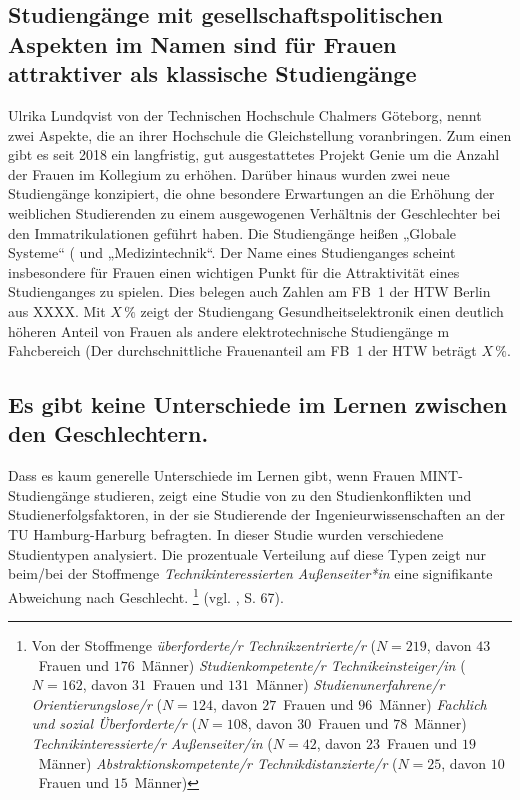 \documentclass[a4paper, 12 pt]{IEEEtran}
\begin{document}
\subsection{Studiengänge mit gesellschaftspolitischen Aspekten im Namen sind für Frauen attraktiver als klassische Studiengänge}
Ulrika Lundqvist von der Technischen Hochschule Chalmers Göteborg, nennt zwei Aspekte, die an ihrer Hochschule die Gleichstellung voranbringen. Zum einen gibt es seit 2018 ein langfristig, gut ausgestattetes Projekt Genie um die Anzahl der Frauen im Kollegium zu erhöhen. \cite{Chalmers.10.01.2023b} 
Darüber hinaus wurden zwei neue Studiengänge konzipiert, die ohne besondere Erwartungen an die Erhöhung der weiblichen Studierenden zu einem ausgewogenen Verhältnis der Geschlechter bei den Immatrikulationen geführt haben. Die Studiengänge heißen „Globale Systeme“ (\cite{Chalmers.10.01.2023b} und „Medizintechnik“.
Der Name eines Studienganges scheint insbesondere für Frauen einen wichtigen Punkt für die Attraktivität eines Studienganges zu spielen. Dies belegen auch Zahlen am FB~1 der HTW Berlin aus XXXX. Mit $X\,\%$ zeigt der Studiengang Gesundheitselektronik einen deutlich höheren Anteil von Frauen als andere elektrotechnische Studiengänge m Fahcbereich (Der durchschnittliche Frauenanteil am FB~1 der HTW beträgt $X\,\%$.

\subsection{Es gibt keine Unterschiede im Lernen zwischen den Geschlechtern.}
Dass es kaum generelle Unterschiede im Lernen gibt, wenn Frauen MINT-Studiengänge studieren, zeigt eine Studie von \cite{Schmiederer.2012Schmiederer} zu den Studienkonflikten und Studienerfolgsfaktoren, in der sie Studierende der Ingenieurwissenschaften an der TU Hamburg-Harburg befragten. In dieser Studie wurden verschiedene Studientypen analysiert. Die prozentuale Verteilung auf diese Typen zeigt nur beim/bei der Stoffmenge  \emph{Technikinteressierten Außenseiter*in} eine signifikante Abweichung nach Geschlecht.
\footnote{Von der Stoffmenge 
\emph{überforderte/r Technikzentrierte/r} ($N=219$, davon $43$~Frauen und $176$~Männer)
\emph{Studienkompetente/r Technikeinsteiger/in} ($N=162$, davon $31$~Frauen und $131$~Männer)
\emph{Studienunerfahrene/r Orientierungslose/r} ($N= 124$, davon $27$~Frauen und $96$~Männer)
\emph{Fachlich und sozial Überforderte/r}
($N=108$, davon $30$~Frauen und $78$~Männer)
\emph{Technikinteressierte/r Außenseiter/in}
($N=42$, davon $23$~Frauen und $19$~Männer)
\emph{Abstraktionskompetente/r Technikdistanzierte/r}
($N=25$, davon $10$~Frauen und $15$~Männer)} 
(vgl. \cite{Schmiederer.2012}, S. 67).
\end{document}
